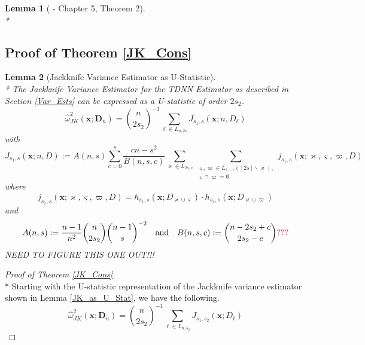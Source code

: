 \documentclass[letterpaper,10pt]{article}
\numberwithin{equation}{section}
\numberwithin{thm}{section}
\newtheorem{lem}{Lemma}
\numberwithin{lem}{section}
\numberwithin{cor}{section}
\renewcommand{\hat}{\widehat}
\newcommand{\1}{\mathbb{1}}
\begin{document}
\begin{lem}[\citet{lee_u-statistics_2019} - Chapter 5, Theorem 2]\mbox{}\\*\label{Lee_ch5thm2}

\end{lem}

\subsection{Proof of Theorem \ref{JK_Cons}}

\begin{lem}[Jackknife Variance Estimator as U-Statistic]\mbox{}\\*
	The Jackknife Variance Estimator for the TDNN Estimator as described in Section \ref{Var_Ests} can be expressed as a U-statistic of order $2s_2$.
	\begin{equation}
		\hat{\omega}^{2}_{JK}\left(\mathbf{x}; \mathbf{D}_n\right)
		= \binom{n}{2s_2}^{-1} \sum_{\ell \in L_{n, 2 s}}J_{s_1, s}\left(\mathbf{x}; n, D_\ell\right)
	\end{equation}
	with
	\begin{equation}
		J_{s_1, s}\left(\mathbf{x}; n, D\right)
		:= A(n, s)
		\sum_{c = 0}^{s} \frac{cn - s^2}{B(n, s, c)}
		\sum_{\varkappa \in L_{2 s, c}}
		\sum_{\substack{\varsigma, \varpi \in L_{s - c}([2 s] \backslash \varkappa),\\
				\varsigma \cap \varpi = \emptyset}}
		j_{s_1, s}\left(\mathbf{x}; \varkappa, \varsigma, \varpi, D\right)
	\end{equation}
	where
	\begin{equation}
		j_{s_1, s}\left(\mathbf{x}; \varkappa, \varsigma, \varpi, D\right) =
		h_{s_1, s}(\mathbf{x}; D_{\varkappa \cup \varsigma}) \cdot
		h_{s_1, s}(\mathbf{x};D_{\varkappa \cup \varpi})
	\end{equation}
	and
	\begin{equation}
		A(n, s) := \frac{n-1}{n^2} \binom{n}{2s_2} \binom{n-1}{s}^{-2}
		\quad \text{and} \quad
		B(n, s, c) := \binom{n-2s_2+c}{2s_2 - c}{\color{red} \text{???}}
	\end{equation}
	{\color{red} NEED TO FIGURE THIS ONE OUT!!!}
\end{lem}

\begin{proof}[Proof of Theorem \ref{JK_Cons}]\mbox{}\\*
	Starting with the U-statistic representation of the Jackknife variance estimator shown in Lemma \ref{JK_as_U_Stat}, we have the following.
	\begin{equation}
		\hat{\omega}^{2}_{JK}\left(\mathbf{x}; \mathbf{D}_n\right)
		= \binom{n}{2s_2}^{-1} \sum_{\ell \in L_{n, s_2}}J_{s_1, s_2}\left(\mathbf{x}; D_\ell\right)
	\end{equation}
\end{proof}
\end{document}
